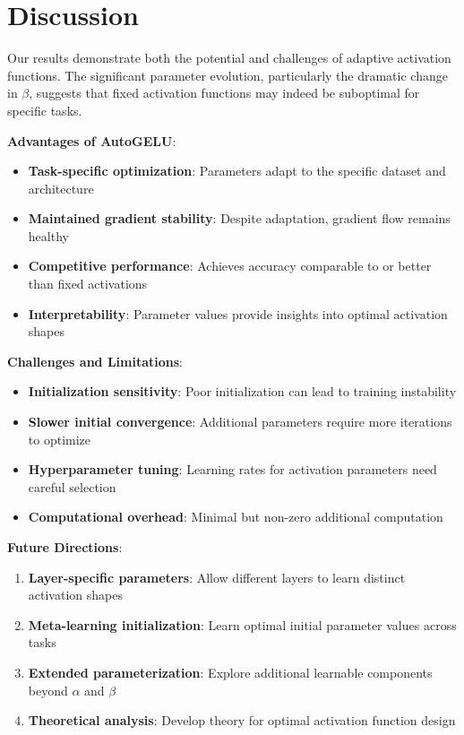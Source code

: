\documentclass{article} %
\begin{document}
\section{Discussion}

Our results demonstrate both the potential and challenges of adaptive activation functions. The significant parameter evolution, particularly the dramatic change in $\beta$, suggests that fixed activation functions may indeed be suboptimal for specific tasks.

\textbf{Advantages of AutoGELU}:
\begin{itemize}
\item \textbf{Task-specific optimization}: Parameters adapt to the specific dataset and architecture
\item \textbf{Maintained gradient stability}: Despite adaptation, gradient flow remains healthy
\item \textbf{Competitive performance}: Achieves accuracy comparable to or better than fixed activations
\item \textbf{Interpretability}: Parameter values provide insights into optimal activation shapes
\end{itemize}

\textbf{Challenges and Limitations}:
\begin{itemize}
\item \textbf{Initialization sensitivity}: Poor initialization can lead to training instability
\item \textbf{Slower initial convergence}: Additional parameters require more iterations to optimize
\item \textbf{Hyperparameter tuning}: Learning rates for activation parameters need careful selection
\item \textbf{Computational overhead}: Minimal but non-zero additional computation
\end{itemize}

\textbf{Future Directions}:
\begin{enumerate}
\item \textbf{Layer-specific parameters}: Allow different layers to learn distinct activation shapes
\item \textbf{Meta-learning initialization}: Learn optimal initial parameter values across tasks
\item \textbf{Extended parameterization}: Explore additional learnable components beyond $\alpha$ and $\beta$
\item \textbf{Theoretical analysis}: Develop theory for optimal activation function design
\end{enumerate}
\end{document}
